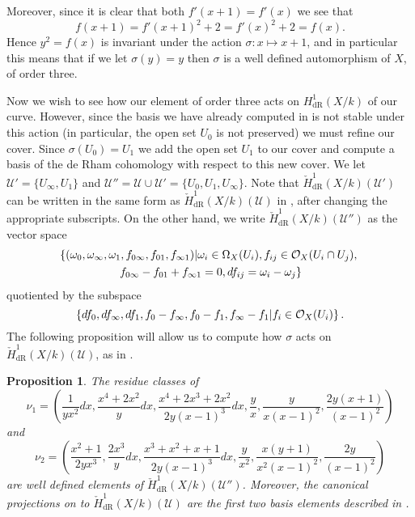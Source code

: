 \documentclass[draft, 11pt]{article} %
\theoremstyle{plain}
\newtheorem{prop}[defn]{Proposition}
\theoremstyle{remark}
\newcommand{\cO}{{\cal O}}
\newcommand{\cU}{{\mathcal U}}
\newcommand{\derhamhone}{H_{\text {dR}}^1(X/k)}
\newcommand{\cechderhamhone}{\check{H}_{\text {dR}}^1(X/k)}
\begin{document}
Moreover, since it is clear that both $f'(x+1) = f'(x)$ we see that
\[
f(x+1) = f'(x+1)^2 + 2 = f'(x)^2 + 2 = f(x).
\]
Hence $y^2 = f(x)$ is invariant under the action $\sigma \colon x \mapsto x+1$, and in particular this means that if we let $\sigma(y) = y$ then $\sigma$ is a well defined automorphism of $X$, of order three.


Now we wish to see how our element of order three acts on $\derhamhone$ of our curve.
However, since the basis we have already computed in \cite[Thm. 2.3]{derhamactions} is not stable under this action (in particular, the open set $U_0$ is not preserved) we must refine our cover.
Since $\sigma(U_0) = U_1$ we add the open set $U_1$ to our cover and compute a basis of the de Rham cohomology with respect to this new cover.
We let $\cU' = \{ U_\infty, U_1\}$ and $\cU'' = \cU \cup \cU' = \{U_0, U_1, U_\infty\}$.
Note that $\cechderhamhone(\cU')$ can be written in the same form as $\cechderhamhone(\cU)$ in \cite[Pg. 2]{derhamactions}, after changing the appropriate subscripts.
On the other hand, we write $\cechderhamhone(\cU'')$ as the vector space
\begin{multline}\label{sixtupleconditions}
\left\{ (\omega_0, \omega_\infty , \omega_1, f_{0\infty}, f_{01},f_{\infty 1}) | \omega_i \in \Omega_X(U_i), f_{ij} \in \cO_X(U_i \cap U_j), \right. \\ \left. f_{0\infty} - f_{01} + f_{\infty1} = 0, df_{ij} = \omega_i - \omega_j \right\}
\end{multline}
quotiented by the subspace 
\[
\left\{ df_0, df_\infty, df_1, f_0- f_\infty, f_0 - f_1, f_\infty - f_1 | f_i \in \cO_X(U_i)\right\}.
\]
The following proposition will allow us to compute how $\sigma$ acts on $\cechderhamhone(\cU)$, as in \cite[\S 3]{canonicalrepresentation}.
\begin{prop}
The residue classes of
\[
\nu_1 = \left(\frac{1}{yx^2}dx, \frac{x^4 + 2x^2}{y}dx, \frac{x^4 + 2x^3 +  2x^2}{2y(x-1)^3}dx, \frac{y}{x}, \frac{y}{x(x-1)^2}, \frac{2y(x+1)}{(x-1)^2} \right)
\]
and
\[
\nu_2 = \left( \frac{x^2 + 1}{2yx^3}, \frac{2x^3}{y}dx, \frac{x^3 + x^2 + x+ 1}{2y(x-1)^3}dx, \frac{y}{x^2}, \frac{x(y +1)}{x^2(x-1)^2}, \frac{2y}{(x-1)^2} \right)
\]
are well defined elements of $\cechderhamhone(\cU'')$.
Moreover, the canonical projections on to $\cechderhamhone(\cU)$ are the first two basis elements described in \cite[Thm. 2.3]{derhamactions}.
\end{prop}
\end{document}
